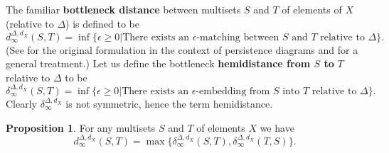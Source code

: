 \documentclass[11pt]{amsart}
\theoremstyle{definition}
\newtheorem{prop}[theorem]{Proposition}
\theoremstyle{remark}
\numberwithin{equation}{section}
\def\ep{\epsilon}
\begin{document}
The familiar \textbf{bottleneck distance} between multisets $S$ and $T$ of elements of $X$ (relative to $\Delta$) is defined to be \[ d_{\infty}^{\Delta,d_X}(S,T)=\inf\{\ep\geq 0|\mbox{There exists an $\ep$-matching between $S$ and $T$ relative to $\Delta$}\}. \] (See \cite{CEH07} for the original formulation in the context of persistence diagrams and \cite{CGGM} for a general treatment.)  Let us define the bottleneck \textbf{hemidistance from $S$ to} $T$ relative to $\Delta$ to be \begin{equation}\label{hemidfn} \delta^{\Delta,d_X}_{\infty}(S,T)=\inf\{ \ep\geq 0|\mbox{There exists an $\ep$-embedding from $S$ into $T$ relative to $\Delta$}  \}.\end{equation}  Clearly $\delta^{\Delta,d_X}_{\infty}$ is not symmetric, hence the term hemidistance.  

\begin{prop}\label{symm} For any multisets $S$ and $T$ of elements $X$ we have \[ d_{\infty}^{\Delta,d_X}(S,T)=\max\{\delta^{\Delta,d_X}_{\infty}(S,T),\delta^{\Delta,d_X}_{\infty}(T,S)\}.\]
\end{prop}
\end{document}
